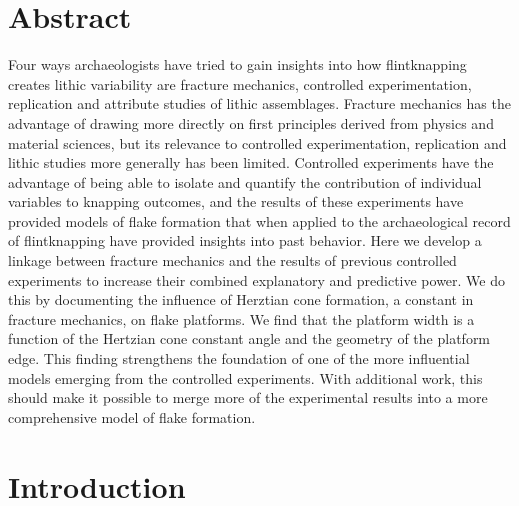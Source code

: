 \documentclass[10pt,letterpaper]{article}
\begin{document}
\section*{Abstract}
Four ways archaeologists have tried to gain insights into how
flintknapping creates lithic variability are fracture mechanics,
controlled experimentation, replication and attribute studies of lithic
assemblages. Fracture mechanics has the advantage of drawing more
directly on first principles derived from physics and material sciences,
but its relevance to controlled experimentation, replication and lithic
studies more generally has been limited. Controlled experiments have the
advantage of being able to isolate and quantify the contribution of
individual variables to knapping outcomes, and the results of these
experiments have provided models of flake formation that when applied to
the archaeological record of flintknapping have provided insights into
past behavior. Here we develop a linkage between fracture mechanics and
the results of previous controlled experiments to increase their
combined explanatory and predictive power. We do this by documenting the
influence of Herztian cone formation, a constant in fracture mechanics,
on flake platforms. We find that the platform width is a function of the
Hertzian cone constant angle and the geometry of the platform edge. This
finding strengthens the foundation of one of the more influential models
emerging from the controlled experiments. With additional work, this
should make it possible to merge more of the experimental results into a
more comprehensive model of flake formation.


\linenumbers

\hypertarget{introduction}{%
\section{Introduction}\label{introduction}}
\end{document}
